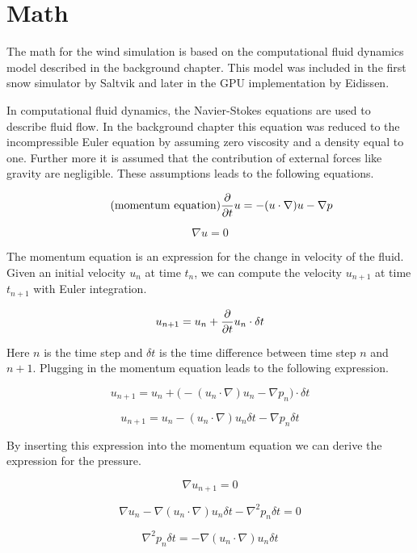 \section{Math}

The math for the wind simulation is based on the computational fluid dynamics
model described in the background chapter. This model was included in the first 
snow simulator by Saltvik\cite{originalSnowThesis} and later in the GPU 
implementation by Eidissen\cite{gpuSnowThesis}.

In computational fluid dynamics, the Navier-Stokes equations are used to describe 
fluid flow. In the background chapter this equation was reduced to the 
incompressible Euler equation by assuming zero viscosity and a density equal to 
one. Further more it is assumed that the contribution of external forces like 
gravity are negligible. These assumptions leads to the following equations. 

\begin{equation} 
	\tag{momentum equation}
	\frac{\partial}{\partial t}u  = -(u \cdot \nabla)u - \nabla p
\end{equation}

\begin{equation}
	\tag{continuity equation}
	\nabla u = 0
\end{equation}

The momentum equation is an expression for the change in velocity of the fluid. 
Given an initial velocity $u_n$ at time $t_n$, we can compute the velocity 
$u_{n+1}$ at time $t_{n+1}$ with Euler integration.

$$ u_{n+1} = u_n + \frac{\partial}{\partial t}u_n \cdot \delta t $$

Here $n$ is the time step and $\delta t$ is the time difference between time step 
$n$ and $n+1$. Plugging in the momentum equation leads to the following expression.

$$ u_{n+1} = u_n + \big( -(u_n \cdot \nabla)u_n - \nabla p_n \big) \cdot \delta t $$

$$ u_{n+1} = u_n - (u_n \cdot \nabla)u_n \delta t - \nabla p_n \delta t $$

By inserting this expression into the momentum equation we can derive the
expression for the pressure. 

$$ \nabla u_{n+1} = 0 $$

$$ \nabla u_n - \nabla (u_n \cdot \nabla)u_n \delta t - \nabla^2 p_n \delta t = 0 $$

$$ \nabla^2 p_n \delta t = - \nabla (u_n \cdot \nabla)u_n \delta t $$

